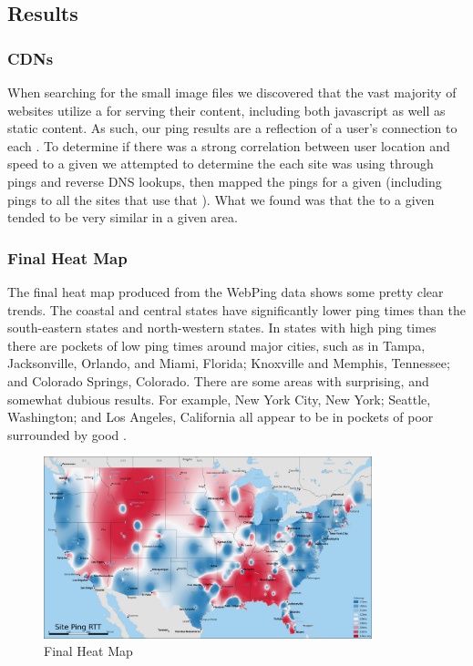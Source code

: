 \subsection{Results}

\subsubsection{CDNs}
When searching for the small image files we discovered that the vast majority of websites utilize a \cdn for serving their content, including both javascript as well as static content. As such, our ping results are a reflection of a user's connection to each \cdn. To determine if there was a strong correlation between user location and speed to a given \cdn we attempted to determine the \cdn each site was using through \icmp pings and reverse DNS lookups, then mapped the pings for a given \cdn (including pings to all the sites that use that \cdn). What we found was that the \rtt to a given \cdn tended to be very similar in a given area.

\subsubsection{Final Heat Map}
The final heat map produced from the WebPing data shows some pretty clear trends. The coastal and central states have significantly lower ping times than the south-eastern states and north-western states. In states with high ping times there are pockets of low ping times around major cities, such as in  Tampa, Jacksonville, Orlando, and Miami, Florida; Knoxville and Memphis, Tennessee; and Colorado Springs, Colorado. There are some areas with surprising, and somewhat dubious results. For example, New York City, New York; Seattle, Washington; and Los Angeles, California all appear to be in pockets of poor \rtt surrounded by good \rtt.

\begin{figure}[H]
    \centering
    \includegraphics[width=0.85\textwidth]{images/siteping/site_ping_rtt_idw.jpg}
    \caption{Final Heat Map}
    \label{fig:siteping)_heatmap}
\end{figure}
